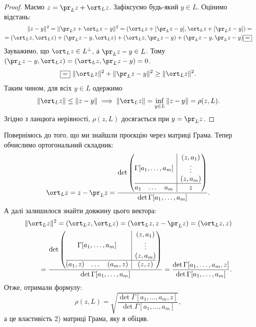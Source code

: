\documentclass{math_library}
\begin{document}
\begin{proof}
Маємо $z = \pr_L z + \ort_L z$. Зафіксуємо будь-який $y \in L$. Оцінимо відстань:
\begin{align*}
\|z-y\|^2 = \|\pr_L z + \ort_L z - y\|^2 = (\ort_L z + [\pr_L z - y], \ort_L z + [\pr_L z - y]) = \\ = (\ort_L z, \ort_L z) + (\pr_L z - y,\ort_L z) + (\ort_L z,\pr_L z - y) + (\pr_L z-y, \pr_L z-y) \boxed{=}
\end{align*}
Зауважимо, що $\ort_L z \in L^\perp$, а $\pr_L z - y \in L$. Тому $(\pr_L z-y,\ort_L z) = (\ort_L z, \pr_L z -y) = 0$.
\[
\boxed{=} \ \|\ort_L z\|^2 + \|\pr_L z - y\|^2 \geq \|\ort_L z\|^2.
\]
Таким чином, для всіх $y \in L$ одержимо 
\[
\|\ort_L z\| \leq \|z-y\| \implies \|\ort_L z\| = \displaystyle\inf_{y \in L} \|z-y\| = \rho(z,L).
\]
Згідно з ланцюга нерівності, $\rho (z,L)$ досягається при $y = \pr_L z$.
\end{proof}
\noindent
Повернімось до того, що ми знайшли проєкцію через матриці Грама. Тепер обчислимо ортогональний складник:
\[
\ort_L z = z - \pr_L z = \dfrac{\det \left(\begin{array}{@{}c|c@{}}
\Gamma[a_1,\dots,a_m] & \begin{matrix} (z,a_1) \\ \vdots \\ (z,a_m) \end{matrix} \\
\hline
\begin{matrix} a_1 & \dots & a_m \end{matrix} & z
\end{array}\right)}{\det\Gamma[a_1,\dots,a_m]}.
\]
А далі залишилося знайти довжину цього вектора:
\begin{align*}
\| \ort_L z\|^2 = (\ort_L z, \ort_L z) = (\ort_L z, z - \pr_L z) = (\ort_L z, z) \\ = \dfrac{\det \left(\begin{array}{@{}c|c@{}}
\Gamma[a_1,\dots,a_m] & \begin{matrix} (z,a_1) \\ \vdots \\ (z,a_m) \end{matrix} \\
\hline
\begin{matrix} (a_1,z) & \dots & (a_m,z) \end{matrix} & (z,z)
\end{array}\right)}{\det\Gamma[a_1,\dots,a_m]} = \dfrac{\det\Gamma[a_1,\dots,a_m,z]}{\det\Gamma[a_1,\dots,a_m]}.
\end{align*}
Отже, отримали формулу: \[
\rho(z,L) = \sqrt{\dfrac{\det\Gamma[a_1,\dots,a_m,z]}{\det\Gamma[a_1,\dots,a_m]}},
\]
а це властивість 2) матриці Грама, яку я обіцяв.
\end{document}
